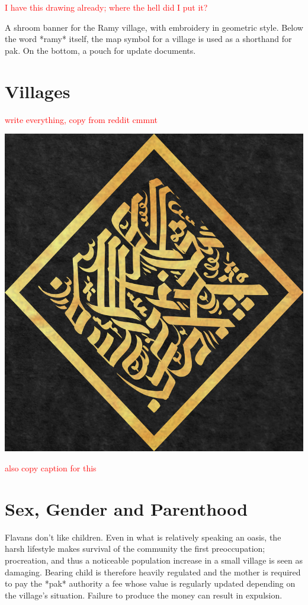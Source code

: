 \documentclass[10pt,oneside]{memoir}
\newcommand{\cmmnt}[1]{\textcolor{red}{#1}}
\begin{document}
\cmmnt{I have this drawing already; where the hell did I put it?}

A shroom banner for the Ramy village, with embroidery in geometric style. Below the word *ramy* itself, the map symbol for a village is used as a shorthand for pak. On the bottom, a pouch for update documents.

\pagebreak

\section{Villages}

\cmmnt{write everything, copy from reddit cmmnt}

\includegraphics{../drawings/bigseal_gold_small}

\cmmnt{also copy caption for this}


\pagebreak

\section{Sex, Gender and Parenthood}

Flavans don't like children. Even in what is relatively speaking an oasis, the harsh lifestyle makes survival of the community the first preoccupation; procreation, and thus a noticeable population increase in a small village is seen as damaging. Bearing child is therefore heavily regulated and the mother is required to pay the *pak* authority a fee whose value is regularly updated depending on the village's situation. Failure to produce the money can result in expulsion.
\end{document}

